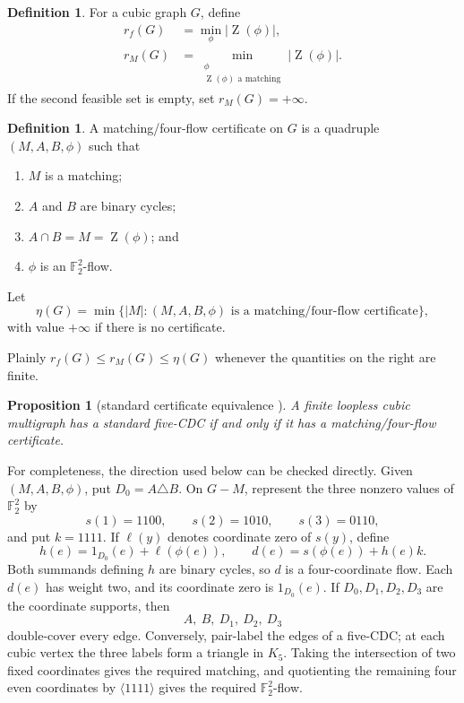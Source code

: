 \documentclass[11pt]{article}
\newtheorem{proposition}[theorem]{Proposition}
\theoremstyle{definition}
\newtheorem{definition}[theorem]{Definition}
\newcommand{\F}{\mathbb F}
\newcommand{\Zer}{\operatorname{Z}}
\newcommand{\etaext}{\eta}
\begin{document}
\begin{definition}
For a cubic graph \(G\), define
\[
\begin{split}
r_f(G)&=\min_{\phi}|\Zer(\phi)|,\\
r_M(G)&=\min_{\substack{\phi\\ \Zer(\phi)\text{ a matching}}}
              |\Zer(\phi)|.
\end{split}
\]
If the second feasible set is empty, set \(r_M(G)=+\infty\).
\end{definition}

\begin{definition}
A matching/four-flow certificate on \(G\) is a quadruple
\((M,A,B,\phi)\) such that
\begin{enumerate}
\item \(M\) is a matching;
\item \(A\) and \(B\) are binary cycles;
\item \(A\cap B=M=\Zer(\phi)\); and
\item \(\phi\) is an \(\F_2^2\)-flow.
\end{enumerate}
Let
\[
 \etaext(G)=\min\{|M|:(M,A,B,\phi)
       \text{ is a matching/four-flow certificate}\},
\]
with value \(+\infty\) if there is no certificate.
\end{definition}

Plainly \(r_f(G)\le r_M(G)\le\etaext(G)\) whenever the quantities on the
right are finite.

\begin{proposition}[standard certificate equivalence {\cite[Corollary
0.6]{HoffmannOstenhof2013}}]
\label{prop:equivalence}
A finite loopless cubic multigraph has a standard five-CDC if and only if
it has a matching/four-flow certificate.
\end{proposition}

For completeness, the direction used below can be checked directly.
Given \((M,A,B,\phi)\), put \(D_0=A\triangle B\).  On \(G-M\), represent
the three nonzero values of \(\F_2^2\) by
\[
 s(1)=1100,\qquad s(2)=1010,\qquad s(3)=0110,
\]
and put \(k=1111\).  If \(\ell(y)\) denotes coordinate zero of \(s(y)\),
define
\[
 h(e)=1_{D_0}(e)+\ell(\phi(e)),\qquad
 d(e)=s(\phi(e))+h(e)k.
\]
Both summands defining \(h\) are binary cycles, so \(d\) is a
four-coordinate flow.  Each \(d(e)\) has weight two, and its coordinate
zero is \(1_{D_0}(e)\).  If \(D_0,D_1,D_2,D_3\) are the coordinate
supports, then
\[
 A,\ B,\ D_1,\ D_2,\ D_3
\]
double-cover every edge.  Conversely, pair-label the edges of a five-CDC;
at each cubic vertex the three labels form a triangle in \(K_5\).
Taking the intersection of two fixed coordinates gives the required
matching, and quotienting the remaining four even coordinates by
\(\langle1111\rangle\) gives the required \(\F_2^2\)-flow.
\end{document}
